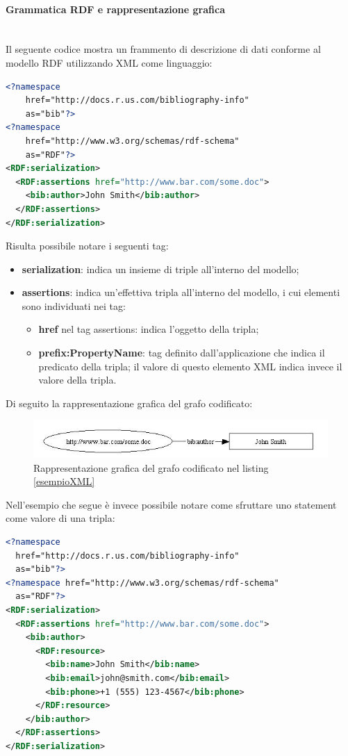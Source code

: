 \documentclass[12pt,a4paper,twoside]{book}
\begin{document}
\paragraph{Grammatica RDF e rappresentazione grafica}\mbox{}\\
Il seguente codice mostra un frammento di descrizione di dati conforme al modello RDF utilizzando XML come linguaggio:
\begin{lstlisting}[language=xml,firstnumber=1,caption={Esempio di metadato conforme ad RDF in XML},captionpos=b,label=esempioXML]
<?namespace 
	href="http://docs.r.us.com/bibliography-info"
	as="bib"?> 
<?namespace 
	href="http://www.w3.org/schemas/rdf-schema"
	as="RDF"?> 
<RDF:serialization> 
  <RDF:assertions href="http://www.bar.com/some.doc"> 
    <bib:author>John Smith</bib:author> 
  </RDF:assertions> 
</RDF:serialization>
\end{lstlisting}
Risulta possibile notare i seguenti tag:
\begin{itemize}
\item \textbf{serialization}: indica un insieme di triple all'interno del modello;
\item \textbf{assertions}: indica un'effettiva tripla all'interno del modello, i cui elementi sono individuati nei tag:
\begin{itemize}
\item \textbf{href} nel tag assertions: indica l'oggetto della tripla;
\item \textbf{prefix:PropertyName}: tag definito dall'applicazione che indica il predicato della tripla; il valore di questo elemento XML indica invece il valore della tripla.
\end{itemize}
\end{itemize}
Di seguito la rappresentazione grafica del grafo codificato:
\begin{figure}[H]
\centering
\includegraphics[scale=.50]{../immagini/RDFXML.jpg}
\caption{Rappresentazione grafica del grafo codificato nel listing \ref{esempioXML}}
\label{imgEsempioXML}
\end{figure}\newpage
Nell'esempio che segue è invece possibile notare come sfruttare uno statement come valore di una tripla:
\begin{lstlisting}[language=xml,firstnumber=1,caption={Esempio di metadato conforme ad RDF in XML},captionpos=b,label=esempioComplexXML]
<?namespace 
  href="http://docs.r.us.com/bibliography-info"
  as="bib"?> 
<?namespace href="http://www.w3.org/schemas/rdf-schema"
  as="RDF"?> 
<RDF:serialization> 
  <RDF:assertions href="http://www.bar.com/some.doc"> 
    <bib:author> 
      <RDF:resource> 
        <bib:name>John Smith</bib:name> 
        <bib:email>john@smith.com</bib:email> 
        <bib:phone>+1 (555) 123-4567</bib:phone> 
      </RDF:resource> 
    </bib:author> 
  </RDF:assertions> 
</RDF:serialization>
\end{lstlisting}
\end{document}
